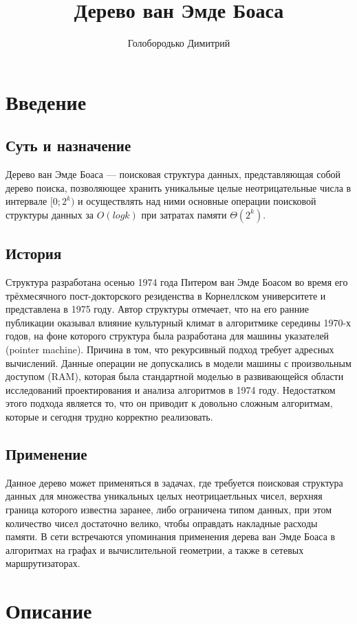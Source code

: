 \documentclass{article}
\title{Дерево ван Эмде Боаса}
\author{Голобородько Димитрий}
\begin{document}
\maketitle


\section{Введение}
\subsection{Суть и назначение}
Дерево ван Эмде Боаса — поисковая структура данных, представляющая собой дерево поиска, позволяющее хранить уникальные целые неотрицательные числа в интервале $[0;2^k)$ и осуществлять над ними основные операции поисковой структуры данных за $O(log{k})$ при затратах памяти $\Theta(2^k)$.
\subsection{История}
Структура разработана осенью 1974 года Питером ван Эмде Боасом во время его трёхмесячного пост-докторского резиденства в Корнеллском университете и представлена в 1975 году. Автор структуры отмечает, что на его ранние публикации оказывал влияние культурный климат в алгоритмике середины 1970-х годов, на фоне которого структура была разработана для машины указателей (pointer machine). Причина в том, что рекурсивный подход требует адресных вычислений. Данные операции не допускались в модели машины с произвольным доступом (RAM), которая была стандартной моделью в развивающейся области исследований проектирования и анализа алгоритмов в 1974 году. Недостатком этого подхода является то, что он приводит к довольно сложным алгоритмам, которые и сегодня трудно корректно реализовать. 
\subsection{Применение}
Данное дерево может применяться в задачах, где требуется поисковая структура данных для множества уникальных целых неотрицаетльных чисел, верхняя граница которого известна заранее, либо ограничена типом данных, при этом количество чисел достаточно велико, чтобы оправдать накладные расходы памяти.
В сети встречаются упоминания применения дерева ван Эмде Боаса в алгоритмах на графах и вычислительной геометрии, а также в сетевых маршрутизаторах.
\section{Описание}
\end{document}
